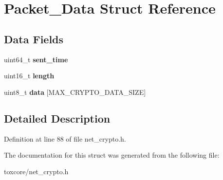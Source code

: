 \hypertarget{struct_packet___data}{\section{Packet\+\_\+\+Data Struct Reference}
\label{struct_packet___data}
}
\subsection*{Data Fields}
\begin{DoxyCompactItemize}
\item 
\hypertarget{struct_packet___data_ae6e5e2c139451ff48ec8dbba5d21bb50}{uint64\+\_\+t {\bfseries sent\+\_\+time}}\label{struct_packet___data_ae6e5e2c139451ff48ec8dbba5d21bb50}

\item 
\hypertarget{struct_packet___data_a1892eba2086d12ac2b09005aeb09ea3b}{uint16\+\_\+t {\bfseries length}}\label{struct_packet___data_a1892eba2086d12ac2b09005aeb09ea3b}

\item 
\hypertarget{struct_packet___data_ab895a6b34c217017925a6aea69c78c09}{uint8\+\_\+t {\bfseries data} \mbox{[}M\+A\+X\+\_\+\+C\+R\+Y\+P\+T\+O\+\_\+\+D\+A\+T\+A\+\_\+\+S\+I\+Z\+E\mbox{]}}\label{struct_packet___data_ab895a6b34c217017925a6aea69c78c09}

\end{DoxyCompactItemize}


\subsection{Detailed Description}


Definition at line 88 of file net\+\_\+crypto.\+h.



The documentation for this struct was generated from the following file\+:\begin{DoxyCompactItemize}
\item 
toxcore/net\+\_\+crypto.\+h\end{DoxyCompactItemize}
